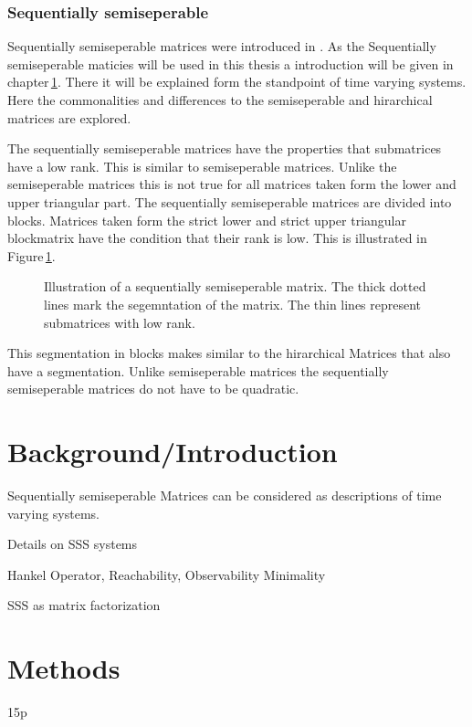 \documentclass[doctype=mastersthesis,BCOR=15mm,biblatex]{ldvbook}%
\begin{document}
\subsection{Sequentially semiseperable}
Sequentially semiseperable matrices were introduced in \cite{dewilde_time-varying_1998}.
As the Sequentially semiseperable maticies will be used in this thesis a introduction will be given in chapter\,\ref{chap:background}. 
There it will be explained form the standpoint of time varying systems.
Here the commonalities and differences to the semiseperable and hirarchical matrices are explored.

The sequentially semiseperable matrices have the properties that submatrices have a low rank.
This is similar to semiseperable matrices. 
Unlike the semiseperable matrices this is not true for all matrices taken form the lower and upper triangular part.
The sequentially semiseperable matrices are divided into blocks.
Matrices taken form the strict lower and strict upper triangular blockmatrix have the condition that their rank is low.
This is illustrated in Figure\,\ref{fig:sequentiallysep}.

\begin{figure}
	\centering
	
	\caption{Illustration of a sequentially semiseperable matrix. The thick dotted lines mark the segemntation of the matrix. The thin lines represent submatrices with low rank.}
	\label{fig:sequentiallysep}
\end{figure}

This segmentation in blocks makes similar to the hirarchical Matrices that also have a segmentation.
Unlike semiseperable matrices the sequentially semiseperable matrices do not have to be quadratic. 

\chapter{Background/Introduction}\label{chap:background}

Sequentially semiseperable Matrices can be considered as descriptions of time varying systems.

Details on SSS systems

Hankel Operator, Reachability, Observability
Minimality

SSS as matrix factorization


\chapter{Methods} 15p
\end{document}
